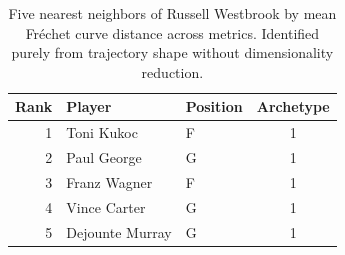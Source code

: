 \begin{table}[htbp]
  \centering\small
  \begin{tabular}{rllc}
    \toprule
    Rank & Player & Position & Archetype \\
    \midrule
    1 & Toni Kukoc & F & 1 \\
    2 & Paul George & G & 1 \\
    3 & Franz Wagner & F & 1 \\
    4 & Vince Carter & G & 1 \\
    5 & Dejounte Murray & G & 1 \\
    \bottomrule
  \end{tabular}
  \caption{Five nearest neighbors of Russell Westbrook by mean Fr\'{e}chet curve distance across metrics. Identified purely from trajectory shape without dimensionality reduction.}
  \label{tab:Russell_Westbrook_frechet_curve_neighbors}
\end{table}


